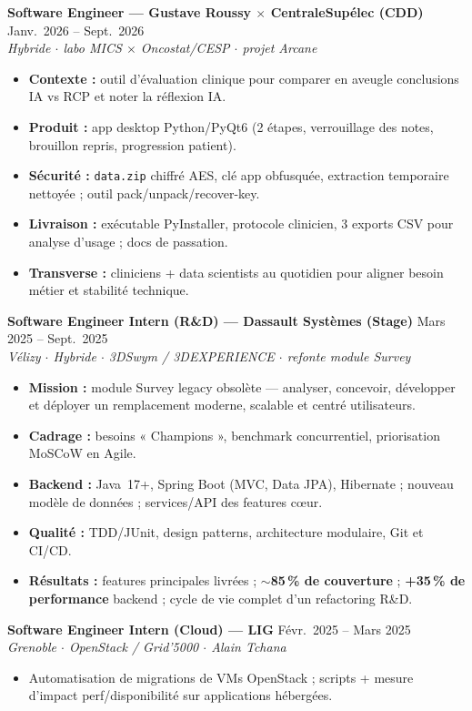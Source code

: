 \documentclass[10pt,a4paper]{article}
\begin{document}
\textbf{Software Engineer --- Gustave Roussy $\times$ CentraleSupélec (CDD)} \hfill Janv.\ 2026 -- Sept.\ 2026\\
{\small\textit{Hybride $\cdot$ labo MICS $\times$ Oncostat/CESP $\cdot$ projet Arcane}}
\begin{itemize}
  \item \textbf{Contexte :} outil d'évaluation clinique pour comparer en aveugle conclusions IA vs RCP et noter la réflexion IA.
  \item \textbf{Produit :} app desktop Python/PyQt6 (2 étapes, verrouillage des notes, brouillon repris, progression patient).
  \item \textbf{Sécurité :} \texttt{data.zip} chiffré AES, clé app obfusquée, extraction temporaire nettoyée ; outil pack/unpack/recover-key.
  \item \textbf{Livraison :} exécutable PyInstaller, protocole clinicien, 3 exports CSV pour analyse d'usage ; docs de passation.
  \item \textbf{Transverse :} cliniciens + data scientists au quotidien pour aligner besoin métier et stabilité technique.
\end{itemize}

\textbf{Software Engineer Intern (R\&D) --- Dassault Systèmes (Stage)} \hfill Mars 2025 -- Sept.\ 2025\\
{\small\textit{Vélizy $\cdot$ Hybride $\cdot$ 3DSwym / 3DEXPERIENCE $\cdot$ refonte module Survey}}
\begin{itemize}
  \item \textbf{Mission :} module Survey legacy obsolète --- analyser, concevoir, développer et déployer un remplacement moderne, scalable et centré utilisateurs.
  \item \textbf{Cadrage :} besoins « Champions », benchmark concurrentiel, priorisation MoSCoW en Agile.
  \item \textbf{Backend :} Java~17+, Spring Boot (MVC, Data JPA), Hibernate ; nouveau modèle de données ; services/API des features cœur.
  \item \textbf{Qualité :} TDD/JUnit, design patterns, architecture modulaire, Git et CI/CD.
  \item \textbf{Résultats :} features principales livrées ; $\sim$\textbf{85\,\% de couverture} ; \textbf{+35\,\% de performance} backend ; cycle de vie complet d'un refactoring R\&D.
\end{itemize}

\textbf{Software Engineer Intern (Cloud) --- LIG} \hfill Févr.\ 2025 -- Mars 2025\\
{\small\textit{Grenoble $\cdot$ OpenStack / Grid'5000 $\cdot$ Alain Tchana}}
\begin{itemize}
  \item Automatisation de migrations de VMs OpenStack ; scripts + mesure d'impact perf/disponibilité sur applications hébergées.
\end{itemize}
\end{document}
